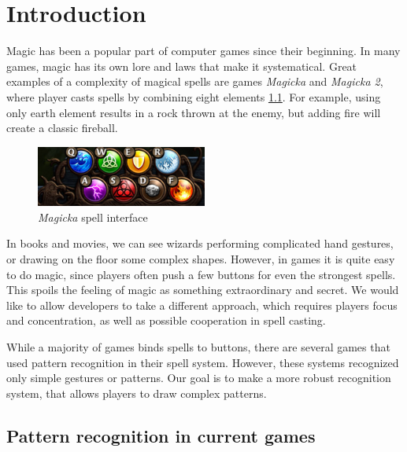 
\chapter{Introduction}
\label{chap:gf}

Magic has been a popular part of computer games since their beginning. In many games, magic has its own lore and laws that make it systematical. Great examples of a complexity of magical spells are games \emph{Magicka} and \emph{Magicka 2}, where player casts spells by combining eight elements \ref{fig:magicka}. For example, using only earth element results in a rock thrown at the enemy, but adding fire will create a classic fireball.
\begin{figure}[!htb]
  \centering
  \includegraphics[width=0.5\textwidth]{ext/magicka.png}
  \caption{\emph{Magicka} spell interface}
  \label{fig:magicka}
\end{figure}

In books and movies, we can see wizards performing complicated hand gestures, or drawing on the floor some complex shapes. However, in games it is quite easy to do magic, since players often push a few buttons for even the strongest spells. This spoils the feeling of magic as something extraordinary and secret. We would like to allow developers to take a different approach, which requires players focus and concentration, as well as possible cooperation in spell casting.

While a majority of games binds spells to buttons, there are several games that used pattern recognition in their spell system. However, these systems recognized only simple gestures or patterns. Our goal is to make a more robust recognition system, that allows players to draw complex patterns.

\section{Pattern recognition in current games}

